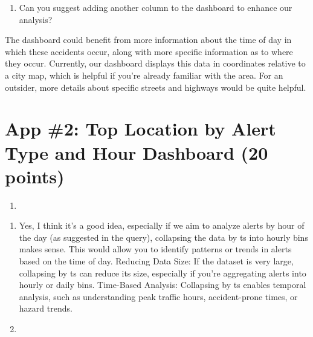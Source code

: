 \documentclass[
  letterpaper,
  DIV=11,
  numbers=noendperiod]{scrartcl}
\providecommand{\tightlist}{%
  \setlength{\itemsep}{0pt}\setlength{\parskip}{0pt}}\usepackage{longtable,booktabs,array}
\begin{document}
\begin{enumerate}
\def\labelenumi{\alph{enumi}.}
\setcounter{enumi}{4}
\tightlist
\item
  Can you suggest adding another column to the dashboard to enhance our
  analysis?
\end{enumerate}

The dashboard could benefit from more information about the time of day
in which these accidents occur, along with more specific information as
to where they occur. Currently, our dashboard displays this data in
coordinates relative to a city map, which is helpful if you're already
familiar with the area. For an outsider, more details about specific
streets and highways would be quite helpful.

\section*{App \#2: Top Location by Alert Type and Hour Dashboard (20
points)}\label{app-2-top-location-by-alert-type-and-hour-dashboard-20-points}

\begin{enumerate}
\def\labelenumi{\arabic{enumi}.}
\tightlist
\item
\end{enumerate}

\begin{enumerate}
\def\labelenumi{\alph{enumi}.}
\item
  Yes, I think it's a good idea, especially if we aim to analyze alerts
  by hour of the day (as suggested in the query), collapsing the data by
  ts into hourly bins makes sense. This would allow you to identify
  patterns or trends in alerts based on the time of day. Reducing Data
  Size: If the dataset is very large, collapsing by ts can reduce its
  size, especially if you're aggregating alerts into hourly or daily
  bins. Time-Based Analysis: Collapsing by ts enables temporal analysis,
  such as understanding peak traffic hours, accident-prone times, or
  hazard trends.
\item
\end{enumerate}
\end{document}

